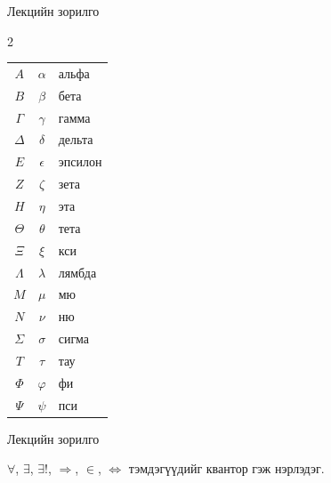 \begin{frame}[allowframebreaks]{Лекцийн зорилго}
\begin{multicols}{2}
\begin{fitbox}
\begin{tabular}{c|c|l}
$A$ & $\alpha$ & альфа \\
$B$ & $\beta$ & бета \\
$\Gamma$ & $\gamma$ & гамма \\
$\Delta$ & $\delta$ & дельта \\
$E$ & $\epsilon$ & эпсилон \\
$Z$ & $\zeta$ & зета \\
$H$ & $\eta$ & эта \\
$\Theta$ & $\theta$ & тета \\
$\Xi$ & $\xi$ & кси \\
$\Lambda$ & $\lambda$ & лямбда \\
$M$ & $\mu$ & мю \\
$N$ & $\nu$ & ню \\
$\Sigma$ & $\sigma$ & сигма \\
$T$ & $\tau$ & тау \\
$\Phi$ & $\varphi$ & фи \\
$\Psi$ & $\psi$ & пси  \\
\hline
\end{tabular}\end{fitbox}
\end{multicols}
\end{frame}

\begin{frame}[allowframebreaks]{Лекцийн зорилго}
\begin{remark}
     $\forall$, $\exists$, $\exists!$, $\Rightarrow$, $\in$, $\Leftrightarrow$ тэмдэгүүдийг квантор гэж нэрлэдэг.
\end{remark}
\end{frame}


